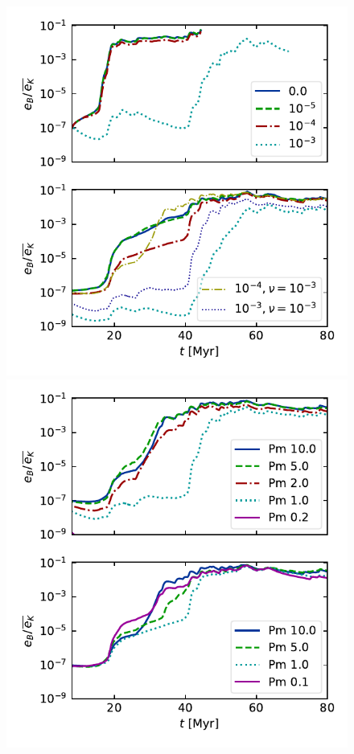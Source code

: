 \documentclass[preprint2]{aastex63}
\begin{document}
{%
\begin{figure}
  \includegraphics[trim=0.5cm 0.0cm 0.3cm 0.0cm, clip=true,width=\columnwidth]{figs/1pc-eB-nu0.pdf}
  \includegraphics[trim=0.5cm 0.0cm 0.3cm 0.0cm, clip=true,width=\columnwidth]{figs/1pc-eB-nu5.pdf}\\

\end{figure}}
\end{document}
